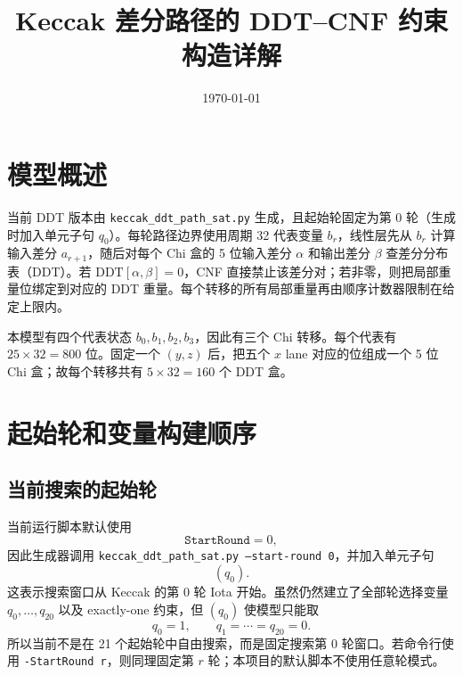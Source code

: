 \documentclass[UTF8,a4paper]{ctexart}
\title{Keccak 差分路径的 DDT--CNF 约束构造详解}
\author{}
\date{\today}
\begin{document}
\maketitle

\section{模型概述}
当前 DDT 版本由 \texttt{keccak\_ddt\_path\_sat.py} 生成，且起始轮固定为第 0 轮（生成时加入单元子句 \(q_0\)）。每轮路径边界使用周期 32 代表变量 \(b_r\)，线性层先从 \(b_r\) 计算输入差分 \(a_{r+1}\)，随后对每个 Chi 盒的 5 位输入差分 \(\alpha\) 和输出差分 \(\beta\) 查差分分布表（DDT）。若 \(\mathrm{DDT}[\alpha,\beta]=0\)，CNF 直接禁止该差分对；若非零，则把局部重量位绑定到对应的 DDT 重量。每个转移的所有局部重量再由顺序计数器限制在给定上限内。

本模型有四个代表状态 \(b_0,b_1,b_2,b_3\)，因此有三个 Chi 转移。每个代表有 \(25\times32=800\) 位。固定一个 \((y,z)\) 后，把五个 \(x\) lane 对应的位组成一个 5 位 Chi 盒；故每个转移共有 \(5\times32=160\) 个 DDT 盒。

\section{起始轮和变量构建顺序}
\subsection{当前搜索的起始轮}
当前运行脚本默认使用
\[
\texttt{StartRound}=0,
\]
因此生成器调用
\texttt{keccak\_ddt\_path\_sat.py --start-round 0}，并加入单元子句
\[
(q_0).
\]
这表示搜索窗口从 Keccak 的第 0 轮 Iota 开始。虽然仍然建立了全部轮选择变量 \(q_0,\ldots,q_{20}\) 以及 exactly-one 约束，但 \((q_0)\) 使模型只能取
\[
q_0=1,\qquad q_1=\cdots=q_{20}=0.
\]
所以当前不是在 21 个起始轮中自由搜索，而是固定搜索第 0 轮窗口。若命令行使用 \texttt{-StartRound r}，则同理固定第 \(r\) 轮；本项目的默认脚本不使用任意轮模式。
\end{document}
